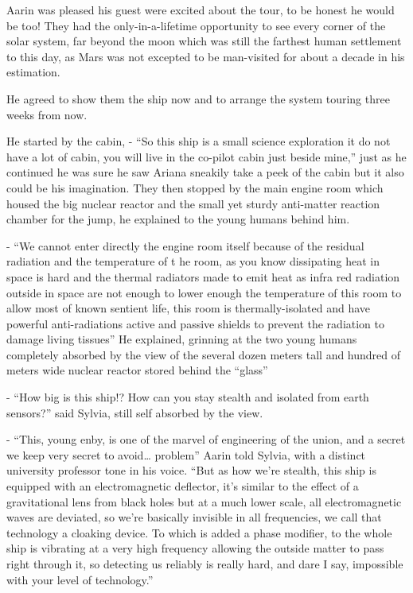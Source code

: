 \documentclass[hidelinks,12pt,a4paper]{book}
\begin{document}
Aarin was pleased his guest were excited about the tour, to be honest he would be too! They had the only-in-a-lifetime 
opportunity to see every corner of the solar system, far beyond the moon which was still the farthest human settlement 
to this day, as Mars was not excepted to be man-visited for about a decade in his estimation.\par
\bigskip

He agreed to show them the ship now and to arrange the system touring three weeks from now.\par
\bigskip


He started by the cabin, - “So this ship is a small science exploration it do not have a lot of cabin, you will live 
in the co-pilot cabin just beside mine,” just as he continued he was sure he saw Ariana sneakily take a peek of the 
cabin but it also could be his imagination. They then stopped by the main engine room which housed the big nuclear 
reactor and the small yet sturdy anti-matter reaction chamber for the jump, he explained to the young humans behind him.\par
\bigskip

- “We cannot enter directly the engine room itself because of the residual radiation and the temperature of t
he room, as you know dissipating heat in space is hard and the thermal radiators made to emit heat as infra red radiation 
outside in space are not enough to lower enough the temperature of this room to allow most of known sentient life, 
this room is thermally-isolated and have powerful anti-radiations active and passive shields to prevent the 
radiation to damage living tissues” He explained, grinning at the two young humans completely absorbed by the view 
of the several dozen meters tall and hundred of meters wide nuclear reactor stored behind the “glass”\par
\bigskip

- “How big is this ship!? How can you stay stealth and isolated from earth sensors?” said Sylvia, still self absorbed by 
the view.\par
\bigskip

- “This, young enby, is one of the marvel of engineering of the union, and a secret we keep very secret to 
avoid… problem” Aarin told Sylvia, with a distinct university professor tone in his voice. “But as how we're stealth, 
this ship is equipped with an electromagnetic deflector, it's similar to the effect of a gravitational lens from black
 holes but at a much lower scale, all electromagnetic waves are deviated, so we're basically invisible in all 
 frequencies, we call that technology a cloaking device. To which is added a phase modifier, to the whole ship 
 is vibrating at a very high frequency allowing the outside matter to pass right through it, so detecting us 
 reliably is really hard, and dare I say, impossible with your level of technology.”\par
 \bigskip
\end{document}

